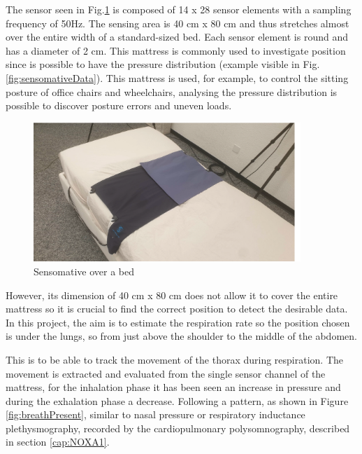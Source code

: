 The sensor seen in Fig.\ref{fig:sensomativeBed} is composed of 14 x 28 sensor elements with a sampling frequency of 50Hz. 
The sensing area is 40 cm x 80 cm and thus stretches almost over the entire width of a standard-sized bed. Each sensor element is round and has a diameter of 2 cm.
This mattress is commonly used to investigate position since is possible to have the pressure distribution (example visible in Fig.\ref{fig:sensomativeData}). This mattress is used, for example, to control the sitting posture of office chairs and wheelchairs, analysing the pressure distribution is possible to discover posture errors and uneven loads.\\

\vspace*{0.5cm}
\begin{figure}[H]
    \centering
    \includegraphics[width=0.9\textwidth]{img/sensomative.png}
    \caption{Sensomative over a bed}
    \label{fig:sensomativeBed}
\end{figure}
\vspace*{0.5cm}

However, its dimension of 40 cm x 80 cm does not allow it to cover the entire mattress so it is crucial to find the correct position to detect the desirable data. In this project, the aim is to estimate the respiration rate so the position chosen is under the lungs, so from just above the shoulder to the middle of the abdomen.

This is to be able to track the movement of the thorax during respiration. The movement is extracted and evaluated from the single sensor channel of the mattress, for the inhalation phase it has been seen an increase in pressure and during the exhalation phase a decrease. Following a pattern, as shown in Figure \ref{fig:breathPresent}, similar to nasal pressure or respiratory inductance plethysmography, recorded by the cardiopulmonary polysomnography, described in section \ref{cap:NOXA1}. 

